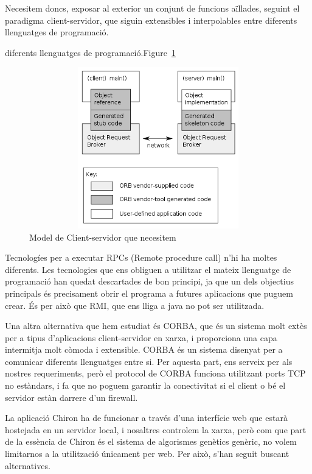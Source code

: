 \documentclass[titlepage,a4paper,12pt]{book}
\begin{document}
	   Necesitem doncs, exposar al exterior un conjunt de funcions aïllades, seguint el
	   paradigma client-servidor, que siguin extensibles i interpolables entre
	   diferents llenguatges de programació.

	   diferents llenguatges de programació.Figure~\ref{fig:401px-Orb.png}

	   \begin{figure}[h]
	   \centering
	   \includegraphics[width=13cm,height=7cm]{401px-Orb.png}
	   \caption{Model de Client-servidor que necesitem}
	   \label{fig:401px-Orb.png}
	   \end{figure} 

	   Tecnologíes per a executar RPCs (Remote procedure call) n'hi ha moltes
	   diferents. Les tecnologies que ens obliguen a utilitzar el mateix llenguatge de
programació han quedat descartades de bon principi, ja que un dels objectius
principals és precisament obrir el programa a futures aplicacions que puguem
crear.  És per això que RMI, que ens lliga a java no pot ser utilitzada.  

Una altra alternativa que hem estudiat és CORBA, que és un sistema molt extès
per a tipus d'aplicacions client-servidor en xarxa, i proporciona una capa
intermitja molt còmoda i extensible.  CORBA és un sistema disenyat per a
comunicar diferents llenguatges entre si.  Per aquesta part, ens serveix per als
nostres requeriments, però el protocol de CORBA funciona utilitzant ports TCP
no estàndars, i fa que no poguem garantir la conectivitat si el client o bé el
servidor estàn darrere d'un firewall.

La aplicació Chiron ha de funcionar a través d'una interfície web que estarà
hostejada en un servidor local, i nosaltres controlem la xarxa, però com que
part de la essència de Chiron és el sistema de algorismes genètics genèric, no
volem limitarnos a la utilització únicament per web.  Per això, s'han seguit
buscant alternatives.
\end{document}
